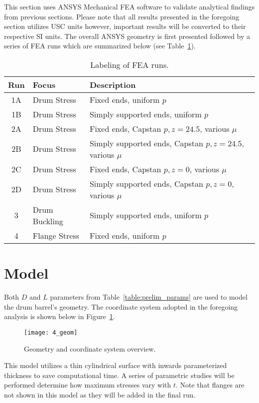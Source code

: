 This section uses ANSYS Mechanical FEA software \cite{ANSYS} to validate analytical findings from previous sections. Please note that all results presented in the foregoing section utilizes USC units however, important results will be converted to their respective SI units. The overall ANSYS geometry is first presented followed by a series of FEA runs which are summarized below (see Table~\ref{table:4_runs}).

\begin{table}[H]
  \centering
  \caption{Labeling of FEA runs.}
    \begin{tabular}{cll}
    \textbf{Run } & \textbf{Focus} & \textbf{Description}\\
    \hline
    1A    & Drum Stress & Fixed ends, uniform $p$\\
    1B    & Drum Stress & Simply supported ends, uniform $p$ \\
    2A    & Drum Stress & Fixed ends, Capstan $p, z=24.5$, various $\mu$ \\
    2B    & Drum Stress & Simply supported ends, Capstan $p, z=24.5$, various $\mu$ \\
    2C    & Drum Stress & Fixed ends, Capstan $p, z=0$, various $\mu$ \\
    2D    & Drum Stress & Simply supported ends, Capstan $p, z=0$, various $\mu$ \\
    3     & Drum Buckling & Simply supported ends, uniform $p$ \\
    4     & Flange Stress & Fixed ends, uniform $p$ \\
    \end{tabular}%
  \label{table:4_runs}%
\end{table}%


\section{Model}

Both $D$ and $L$ parameters from Table~\ref{table:prelim_params} are used to model the drum barrel's geometry. The coordinate system adopted in the foregoing analysis is shown below in Figure~\ref{fig:4_geom}. 

\begin{figure}[H]
	\centering
	\texttt{[image: 4\_geom]}
	\caption{Geometry and coordinate system overview.}
	\label{fig:4_geom}
\end{figure}

This model utilizes a thin cylindrical surface with inwards parameterized thickness to save computational time. A series of parametric studies will be performed determine how maximum stresses vary with $t$. Note that flanges are not shown in this model as they will be added in the final run.\\

